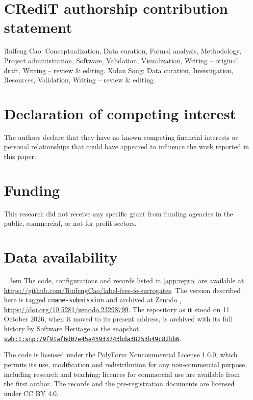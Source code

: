 \section*{CRediT authorship contribution statement}

Ruifeng Cao: Conceptualization, Data curation, Formal analysis, Methodology, Project
administration, Software, Validation, Visualization, Writing -- original draft, Writing --
review \& editing. Xidan Song: Data curation, Investigation, Resources, Validation,
Writing -- review \& editing.

\section*{Declaration of competing interest}

The authors declare that they have no known competing financial interests or personal
relationships that could have appeared to influence the work reported in this paper.

\section*{Funding}

This research did not receive any specific grant from funding agencies in the public,
commercial, or not-for-profit sectors.

\section*{Data availability}

{\emergencystretch=3em
The code, configurations and records listed in \ref{app:repro} are available at
\url{https://github.com/RuifengCao/label-free-fe-surrogates}. The version described here is
tagged \texttt{cmame-submission} and archived at Zenodo \cite{Cao2026Zenodo},
\url{https://doi.org/10.5281/zenodo.23298799}. The repository as it stood on 11 October 2026,
when it moved to its present address, is archived with its full history by Software Heritage
as the snapshot
\href{https://archive.softwareheritage.org/swh:1:snp:79f91af6d07e45a45933743bda38253b49c82bb6}{\nolinkurl{swh:1:snp:79f91af6d07e45a45933743bda38253b49c82bb6}}.\par}

The code is licensed under the PolyForm Noncommercial License 1.0.0, which permits its
use, modification and redistribution for any non-commercial purpose, including research
and teaching; licences for commercial use are available from the first author. The records
and the pre-registration documents are licensed under CC BY 4.0.


